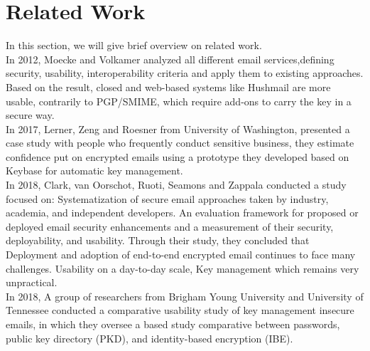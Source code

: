 \section{Related Work}
In this section, we will give brief overview on related work.\\
In 2012, Moecke and Volkamer analyzed all different email services,defining security, usability, interoperability criteria and apply them to existing approaches. Based on the result, closed and web-based systems like Hushmail are more usable, contrarily to PGP/SMIME, which require add-ons to carry the key in a secure way.\cite{usable-secure-email}\\
In 2017, Lerner, Zeng and Roesner from University of Washington, presented a case study with people who frequently conduct sensitive business, they estimate confidence put on encrypted emails using a prototype they developed based on Keybase for automatic key management.\cite{confidente}\\
In 2018, Clark, van Oorschot, Ruoti, Seamons and Zappala conducted a study focused on: Systematization of secure email approaches taken by industry, academia, and independent developers. An evaluation framework for proposed or deployed email security enhancements and a measurement of their security, deployability, and usability. Through their study, they concluded that Deployment and adoption of end-to-end encrypted email continues to face many challenges. Usability on a day-to-day scale, Key management which remains very unpractical.\cite{secure-email}\\
In 2018, A group of researchers from Brigham Young University and University of Tennessee conducted a comparative usability study of key management insecure emails, in which they oversee a based study comparative between passwords, public key directory (PKD), and identity-based encryption (IBE).\cite{comparativestudy}


